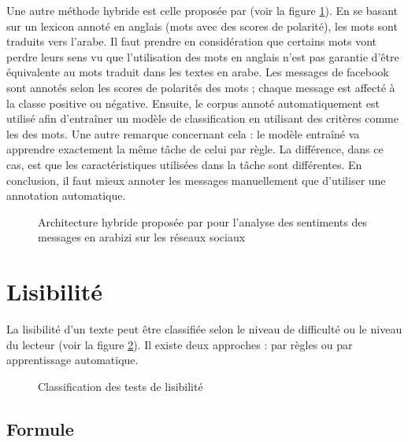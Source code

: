 \documentclass{KodeBook}
\begin{document}
Une autre méthode hybride est celle proposée par \citet{18-guellil-al} (voir la figure \ref{fig:asent-guellil}).
En se basant sur un lexicon annoté en anglais (mots avec des scores de polarité), les mots sont traduits vers l'arabe. 
Il faut prendre en considération que certains mots vont perdre leurs sens vu que l'utilisation des mots en anglais n'est pas garantie d'être équivalente au mots traduit dans les textes en arabe. 
Les messages de facebook sont annotés selon les scores de polarités des mots ; chaque message est affecté à la classe positive ou négative.
Ensuite, le corpus annoté automatiquement est utilisé afin d'entraîner un modèle de classification en utilisant des critères comme les  des mots. 
Une autre remarque concernant cela : le modèle entraîné va apprendre exactement la même tâche de celui par règle.
La différence, dans ce cas, est que les caractéristiques utilisées dans la tâche sont différentes.
En conclusion, il faut mieux annoter les messages manuellement que d'utiliser une annotation automatique.

\begin{figure}
	\centering
	\caption[Architecture hybride pour l'analyse des sentiments en arabizi]{Architecture hybride proposée par \citet{18-guellil-al} pour l'analyse des sentiments des messages en arabizi sur les réseaux sociaux}
	\label{fig:asent-guellil}
\end{figure}

\section{Lisibilité}

La lisibilité d'un texte peut être classifiée selon le niveau de difficulté ou le niveau du lecteur (voir la figure \ref{fig:lisibilite-classif}). 
Il existe deux approches : par règles ou par apprentissage automatique.

\begin{figure}[!ht]
	\centering
	\caption{Classification des tests de lisibilité}
	\label{fig:lisibilite-classif}
\end{figure}

\subsection{Formule}
\end{document}
